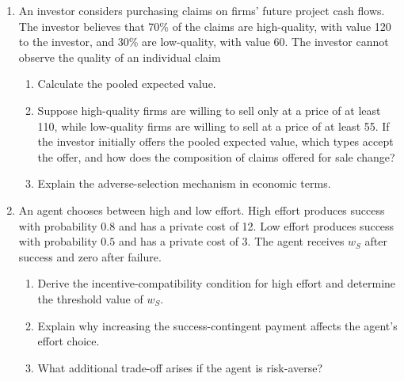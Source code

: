 

\begin{enumerate}

\item An investor considers purchasing claims on firms' future project cash flows. The investor believes that 70\% of the claims are high-quality, with value 120 to the investor, and 30\% are low-quality, with value 60. The investor cannot observe the quality of an individual claim
    \begin{enumerate}

    \item Calculate the pooled expected value.
    
    \item Suppose high-quality firms are willing to sell only at a price of at least 110, while low-quality firms are willing to sell at a price of at least 55. If the investor initially offers the pooled expected value, which types accept the offer, and how does the composition of claims offered for sale change?

    \item Explain the adverse-selection mechanism in economic terms.

    \end{enumerate}

\item An agent chooses between high and low effort. High effort produces success with probability $0.8$ and has a private cost of 12. Low effort produces success with probability $0.5$ and has a private cost of 3. The agent receives $w_S$ after success and zero after failure.

  \begin{enumerate}

  \item Derive the incentive-compatibility condition for high effort and determine the threshold value of $w_S$.

  \item Explain why increasing the success-contingent payment affects the agent's effort choice.

  \item What additional trade-off arises if the agent is risk-averse?

  \end{enumerate}


\end{enumerate}
